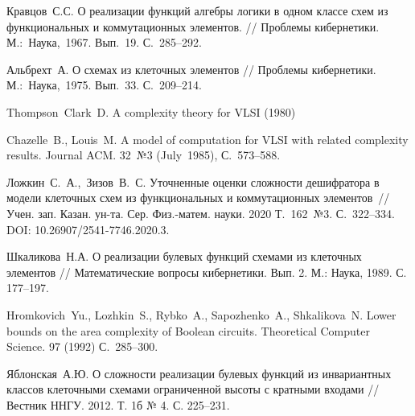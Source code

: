 \begin{thebibliography}{99} %
 Кравцов~С.С. О реализации функций алгебры логики в одном классе схем из функциональных и коммутационных элементов. // Проблемы кибернетики. М.:~Наука,~1967. Вып.~19. С.~285--292.

 Альбрехт~А. О схемах из клеточных элементов // Проблемы кибернетики. М.:~Наука,~1975. Вып.~33. С.~209--214.

 Thompson~Clark~D. A complexity theory for VLSI (1980)

 Chazelle~B., Louis~M. A model of computation for VLSI with related complexity results.   Journal ACM. 32~№3 (July~1985), С.~573--588.

 Ложкин~С.~А.,~Зизов~В.~С. Уточненные оценки сложности дешифратора в модели клеточных схем из функциональных и коммутационных элементов~// Учен. зап. Казан. ун-та. Сер. Физ.-матем. науки. 2020 Т.~162~№3. С.~322--334. DOI: 10.26907/2541-7746.2020.3.

 Шкаликова~Н.А. О реализации булевых функций схемами из клеточных элементов // Математические вопросы кибернетики. Вып. 2. М.: Наука, 1989. С. 177--197.

 Hromkovich~Yu., Lozhkin~S., Rybko~A., Sapozhenko~A., Shkalikova~N. Lower bounds on the area complexity of Boolean circuits. Theoretical Computer Science. 97 (1992) С.~285--300.

 Яблонская~А.Ю. О сложности реализации булевых функций из инвариантных классов клеточными схемами ограниченной высоты с кратными входами // Вестник ННГУ. 2012. Т. 1б № 4. С. 225--231.

\end{thebibliography}





%

